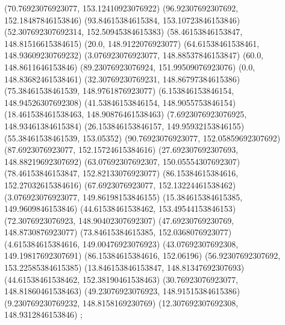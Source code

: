 {{{		(70.76923076923077, 153.12410923076922)
		(96.92307692307692, 152.18487846153846)
		(93.84615384615384, 153.10723846153846)
		(52.307692307692314, 152.50945384615383)
		(58.46153846153847, 148.81516615384615)
		(20.0, 148.9122076923077)
		(64.61538461538461, 148.93609230769232)
		(3.076923076923077, 148.88537846153847)
		(60.0, 148.8611646153846)
		(89.23076923076924, 151.99509076923076)
		(0.0, 148.83682461538461)
		(32.30769230769231, 148.86797384615386)
		(75.38461538461539, 148.9761876923077)
		(6.153846153846154, 148.94526307692308)
		(41.53846153846154, 148.9055753846154)
		(18.461538461538463, 148.90876461538463)
		(7.6923076923076925, 148.93461384615384)
		(26.153846153846157, 149.95932153846155)
		(55.38461538461539, 153.05352)
		(90.76923076923077, 152.05859692307692)
		(87.6923076923077, 152.15724615384616)
		(27.692307692307693, 148.88219692307692)
		(63.07692307692307, 150.05554307692307)
		(78.46153846153847, 152.82133076923077)
		(86.15384615384616, 152.27032615384616)
		(67.6923076923077, 152.13224461538462)
		(3.076923076923077, 149.86198153846155)
		(15.384615384615385, 149.9609846153846)
		(44.61538461538462, 153.49544153846153)
		(72.3076923076923, 148.90402307692307)
		(47.69230769230769, 148.8730876923077)
		(73.84615384615385, 152.0368076923077)
		(4.615384615384616, 149.00476923076923)
		(43.07692307692308, 149.19817692307691)
		(86.15384615384616, 152.06196)
		(56.92307692307692, 153.22585384615385)
		(13.846153846153847, 148.81347692307693)
		(44.61538461538462, 152.38190461538463)
		(30.76923076923077, 148.81860461538463)
		(49.23076923076923, 148.91515384615386)
		(9.230769230769232, 148.8158169230769)
		(12.307692307692308, 148.9312846153846)
	};

}}

